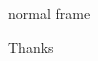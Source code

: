 \documentclass{beamer}
\begin{document}
\begin{frame}
normal frame
\end{frame}

\begin{frame}[standout]
Thanks
\end{frame} 
\end{document}
